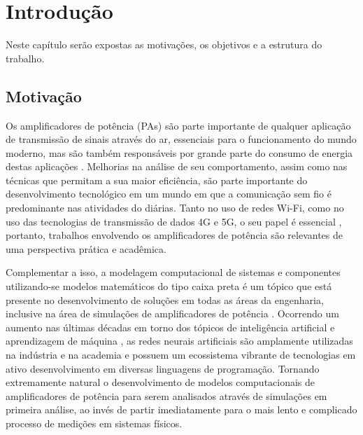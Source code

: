 \chapter{Introdução} \label{cha:introd}
Neste capítulo serão expostas as motivações, os objetivos e a estrutura do trabalho.
\label{item:PI}
\label{item:PA}
\label{item:TLP}
\label{item:MLP}
\label{item:ANN}
\label{item:DPD}
\label{item:PoD}
\label{item:4G}
\label{item:5G}
\label{item:TCC}
\label{item:NMSE}
\label{item:MSE}
\label{item:fase}

\section{Motivação} \label{sec:introd-motiv}
Os amplificadores de potência (PAs) são parte importante de qualquer aplicação de transmissão de sinais através do ar, essenciais para o funcionamento do mundo moderno, mas são também responsáveis por grande parte do consumo de energia destas aplicações \cite{raychaudhuri_frontiers_2012}. Melhorias na análise de seu comportamento, assim como nas técnicas que permitam a sua maior eficiência, são parte importante do desenvolvimento tecnológico em um mundo em que a comunicação sem fio é predominante nas atividades do diárias. Tanto no uso de redes Wi-Fi, como no uso das tecnologias de transmissão de dados 4G e 5G, o seu papel é essencial \cite{9676485}, portanto, trabalhos envolvendo os amplificadores de potência são relevantes de uma perspectiva prática e acadêmica.

Complementar a isso, a modelagem computacional de sistemas e componentes utilizando-se modelos matemáticos do tipo caixa preta é um tópico que está presente no desenvolvimento de soluções em todas as áreas da engenharia, inclusive na área de simulações de amplificadores de potência \cite{pedro_comparative_2005}. Ocorrendo um aumento nas últimas décadas em torno dos tópicos de inteligência artificial e aprendizagem de máquina \cite{Zhao2021}, as redes neurais artificiais são amplamente utilizadas na indústria e na academia e possuem um ecossistema vibrante de tecnologias em ativo desenvolvimento em diversas linguagens de programação. Tornando extremamente natural o desenvolvimento de modelos computacionais de amplificadores de potência para serem analisados através de simulações em primeira análise, ao invés de partir imediatamente para o mais lento e complicado processo de medições em sistemas físicos.

